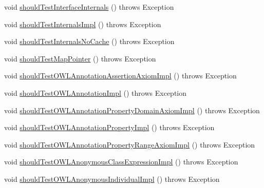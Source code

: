 \begin{DoxyCompactItemize}
\item 
void \hyperlink{classorg_1_1semanticweb_1_1owlapi_1_1contract_1_1_contract_owlapi__1_test_a071e8901e4dfc275b4cf7c8d65bf20d6}{should\-Test\-Interface\-Internals} ()  throws Exception 
\item 
void \hyperlink{classorg_1_1semanticweb_1_1owlapi_1_1contract_1_1_contract_owlapi__1_test_aed2bb2d293c33e2366394939b6b9acaa}{should\-Test\-Internals\-Impl} ()  throws Exception 
\item 
void \hyperlink{classorg_1_1semanticweb_1_1owlapi_1_1contract_1_1_contract_owlapi__1_test_a26f61d188b88bf0d66acb6552946555e}{should\-Test\-Internals\-No\-Cache} ()  throws Exception 
\item 
void \hyperlink{classorg_1_1semanticweb_1_1owlapi_1_1contract_1_1_contract_owlapi__1_test_a2024863031799ace61f540640d938ff1}{should\-Test\-Map\-Pointer} ()  throws Exception 
\item 
void \hyperlink{classorg_1_1semanticweb_1_1owlapi_1_1contract_1_1_contract_owlapi__1_test_ab68efa6ac183cb40f6d0dcf7efd25061}{should\-Test\-O\-W\-L\-Annotation\-Assertion\-Axiom\-Impl} ()  throws Exception 
\item 
void \hyperlink{classorg_1_1semanticweb_1_1owlapi_1_1contract_1_1_contract_owlapi__1_test_a20f1147f085c455c7583bd4d6b91f0ea}{should\-Test\-O\-W\-L\-Annotation\-Impl} ()  throws Exception 
\item 
void \hyperlink{classorg_1_1semanticweb_1_1owlapi_1_1contract_1_1_contract_owlapi__1_test_a9edca7d771aa3eae903a4b8e6362403e}{should\-Test\-O\-W\-L\-Annotation\-Property\-Domain\-Axiom\-Impl} ()  throws Exception 
\item 
void \hyperlink{classorg_1_1semanticweb_1_1owlapi_1_1contract_1_1_contract_owlapi__1_test_a4f79915674cc159dd2c70fc93a25e926}{should\-Test\-O\-W\-L\-Annotation\-Property\-Impl} ()  throws Exception 
\item 
void \hyperlink{classorg_1_1semanticweb_1_1owlapi_1_1contract_1_1_contract_owlapi__1_test_a65c08f848d9b85727929efd79fe39d9a}{should\-Test\-O\-W\-L\-Annotation\-Property\-Range\-Axiom\-Impl} ()  throws Exception 
\item 
void \hyperlink{classorg_1_1semanticweb_1_1owlapi_1_1contract_1_1_contract_owlapi__1_test_a1dfbcae452b42c61a57165dfffe21812}{should\-Test\-O\-W\-L\-Anonymous\-Class\-Expression\-Impl} ()  throws Exception 
\item 
void \hyperlink{classorg_1_1semanticweb_1_1owlapi_1_1contract_1_1_contract_owlapi__1_test_a68e6e3862d5f0a2bea62199073fdb342}{should\-Test\-O\-W\-L\-Anonymous\-Individual\-Impl} ()  throws Exception 

\end{DoxyCompactItemize}
